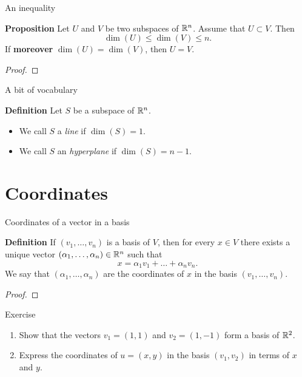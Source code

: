 \documentclass{beamer}
\begin{document}
\begin{frame}[t]{An inequality}
	\begin{block}{\bf Proposition}
		Let	$U$ and $V$ be two subspaces of $\mathbb{R}^n$. Assume that $U \subset V$. Then
		$$
		\dim(U) \leq \dim(V) \leq n.
		$$
		If \textbf{moreover} $\dim(U) = \dim(V)$, then $U = V$.
	\end{block}
	\begin{proof}
		\vspace{3.5cm}
		\vfill
	\end{proof}
\end{frame}

\begin{frame}[t]{A bit of vocabulary}
	\begin{block}{\bf Definition}
		Let $S$ be a subspace of $\mathbb{R}^n$.
		\begin{itemize}
			\item We call $S$ a \emph{line} if $\dim(S) = 1$.
			\item We call $S$ an \emph{hyperplane} if $\dim(S) = n-1$.
		\end{itemize}
	\end{block}
\end{frame}

\section{Coordinates}
\begin{frame}[t]{Coordinates of a vector in a basis}
	\vspace{-0.4cm}
	\begin{block}{\bf Definition}
		If $(v_1, \dots, v_n)$ is a basis of $V$, then for every $x \in V$ there exists a unique vector $(\alpha_1, \dots, \alpha_n) \in \mathbb{R}^n$ such that
		$$
		x = \alpha_1 v_1 + \dots + \alpha_n v_n.
		$$
		We say that $(\alpha_1, \dots, \alpha_n)$ are the coordinates of $x$ in the basis $(v_1, \dots, v_n)$.
	\end{block}
	\begin{proof}
		\vspace{2.5cm}
		\vfill
	\end{proof}
\end{frame}

\begin{frame}[t]{Exercise}
	\vspace{-0.8cm}
	\begin{exampleblock}{}
		\begin{enumerate}
			\item Show that the vectors $v_1 = (1,1)$ and $v_2=(1,-1)$ form a basis of $\mathbb{R}^2$.
			\item Express the coordinates of $u=(x,y)$ in the basis $(v_1,v_2)$ in terms of $x$ and $y$.
		\end{enumerate}
	\end{exampleblock}
	\pause
\end{frame}
\end{document}
